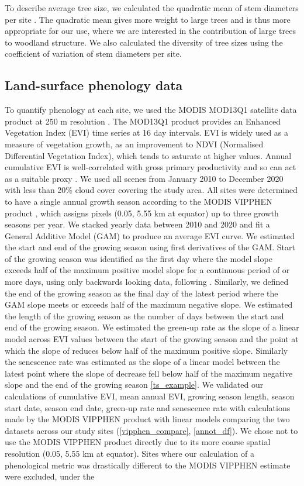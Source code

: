 \documentclass[11pt,a4paper]{article}
\begin{document}
To describe average tree size, we calculated the quadratic mean of stem diameters per site \citep{Curtis2000}. The quadratic mean gives more weight to large trees and is thus more appropriate for our use, where we are interested in the contribution of large trees to woodland structure. We also calculated the diversity of tree sizes using the coefficient of variation of stem diameters per site.

\subsection{Land-surface phenology data}

To quantify phenology at each site, we used the MODIS MOD13Q1 satellite data product at 250 m resolution \citep{MOD13Q1}. The MOD13Q1 product provides an Enhanced Vegetation Index (EVI) time series at 16 day intervals. EVI is widely used as a measure of vegetation growth, as an improvement to NDVI (Normalised Differential Vegetation Index), which tends to saturate at higher values. Annual cumulative EVI is well-correlated with gross primary productivity and so can act as a suitable proxy \citep{Sjostrom2011}. We used all scenes from January 2010 to December 2020 with less than 20\% cloud cover covering the study area. All sites were determined to have a single annual growth season according to the MODIS VIPPHEN product \citep{VIPPHEN}, which assigns pixels (0.05\textdegree, 5.55 km at equator) up to three growth seasons per year. We stacked yearly data between 2010 and 2020 and fit a General Additive Model (GAM) to produce an average EVI curve. We estimated the start and end of the growing season using first derivatives of the GAM. Start of the growing season was identified as the first day where the model slope exceeds half of the maximum positive model slope for a continuous period of \modisWin{} or more days, using only backwards looking data, following \citet{White2009}. Similarly, we defined the end of the growing season as the final day of the latest \trmmWin{} period where the GAM slope meets or exceeds half of the maximum negative slope. We estimated the length of the growing season as the number of days between the start and end of the growing season. We estimated the green-up rate as the slope of a linear model across EVI values between the start of the growing season and the point at which the slope of reduces below half of the maximum positive slope. Similarly the senescence rate was estimated as the slope of a linear model between the latest point where the slope of decrease fell below half of the maximum negative slope and the end of the growing season \autoref{ts_example}. We validated our calculations of cumulative EVI, mean annual EVI, growing season length, season start date, season end date, green-up rate and senescence rate with calculations made by the MODIS VIPPHEN product with linear models comparing the two datasets across our study sites (\autoref{vipphen_compare}, \autoref{annot_df}). We chose not to use the MODIS VIPPHEN product directly due to its more coarse spatial resolution (0.05\textdegree, 5.55 km at equator). Sites where our calculation of a phenological metric was drastically different to the MODIS VIPPHEN estimate were excluded, under the 
\end{document}
